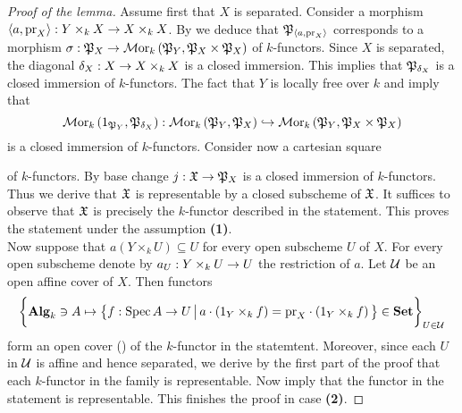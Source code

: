 \begin{proof}[Proof of the lemma]
Assume first that $X$ is separated. Consider a morphism $\langle a, \mathrm{pr}_X\rangle:Y\times_kX\rightarrow X\times_k X$. By {\cite[Corollary 4.6]{Monoid_k_functors}} we deduce that ${\mathfrak P}_{\langle a, \mathrm{pr}_X\rangle}$ corresponds to a morphism $\sigma:{\mathfrak P}_X\rightarrow \mathcal{M}\mathrm{or}_k\left({\mathfrak P}_Y, {\mathfrak P}_X\times {\mathfrak P}_X\right)$ of $k$-functors. Since $X$ is separated, the diagonal $\delta_X:X\rightarrow X\times_k X$ is a closed immersion. This implies that ${\mathfrak P}_{\delta_X}$ is a closed immersion of $k$-functors. The fact that $Y$ is locally free over $k$ and {\cite[Theorem 7.2]{kfunctors}} imply that
$$\mathcal{M}\mathrm{or}_k\left(1_{{\mathfrak P}_Y}, {\mathfrak P}_{\delta_X} \right):\mathcal{M}\mathrm{or}_k\left( {\mathfrak P}_{Y},{\mathfrak P}_{X} \right) \hookrightarrow \mathcal{M}\mathrm{or}_k\left( {\mathfrak P}_{Y}, {\mathfrak P}_{X} \times {\mathfrak P}_{X} \right)$$
is a closed immersion of $k$-functors. Consider now a cartesian square
\begin{center}
\end{center}
of $k$-functors. By base change $j:{\mathfrak X}\rightarrow {\mathfrak P}_X$ is a closed immersion of $k$-functors. Thus we derive that ${\mathfrak X}$ is representable by a closed subscheme of ${\mathfrak X}$. It suffices to observe that ${\mathfrak X}$ is precisely the $k$-functor described in the statement. This proves the statement under the assumption \textbf{(1)}.\\
Now suppose that $a\left(Y\times_kU\right) \subseteq U$ for every open subscheme $U$ of $X$. For every open subscheme denote by $a_U:Y\times_kU\rightarrow U$ the restriction of $a$. Let ${\mathcal U}$ be an open affine cover of $X$. Then functors
$$\bigg\{\mathbf{Alg}_k\ni A\mapsto \big\{f:\mathrm{Spec}\, A\rightarrow U\,\big|\,a\cdot \left(1_Y\times_k f\right) = \mathrm{pr}_X\cdot \left(1_Y\times_k f\right)\big\}\in \mathbf{Set} \bigg\}_{U\in {\mathcal U}}$$
form an open cover ({\cite[Definition 4.5]{kfunctors}}) of the $k$-functor in the statemtent. Moreover, since each $U$ in ${\mathcal U}$ is affine and hence separated, we derive by the first part of the proof that each $k$-functor in the family is representable. Now {\cite[Theorem 4.6]{kfunctors}} imply that the functor in the statement is representable. This finishes the proof in case \textbf{(2)}.
\end{proof}

